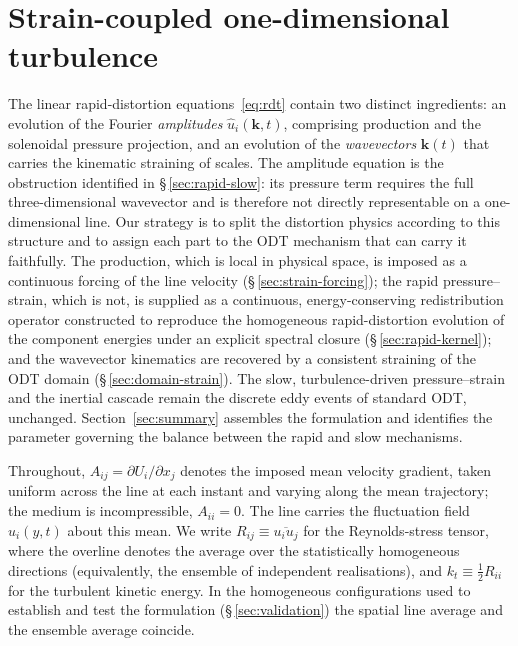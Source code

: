 \documentclass[lineno]{JFM-FLM_Au}
\begin{document}
%

\section{Strain-coupled one-dimensional turbulence}\label{sec:formulation}

The linear rapid-distortion equations~\eqref{eq:rdt} contain two distinct
ingredients: an evolution of the Fourier \emph{amplitudes}
$\hat{u}_i(\boldsymbol{k},t)$, comprising production and the solenoidal
pressure projection, and an evolution of the \emph{wavevectors}
$\boldsymbol{k}(t)$ that carries the kinematic straining of scales. The
amplitude equation is the obstruction identified in
\S\,\ref{sec:rapid-slow}: its pressure term requires the full
three-dimensional wavevector and is therefore not directly representable on
a one-dimensional line. Our strategy is to split the distortion physics
according to this structure and to assign each part to the ODT mechanism
that can carry it faithfully. The production, which is local in physical
space, is imposed as a continuous forcing of the line velocity
(\S\,\ref{sec:strain-forcing}); the rapid pressure--strain, which is not,
is supplied as a continuous, energy-conserving redistribution operator
constructed to reproduce the homogeneous rapid-distortion evolution of the
component energies under an explicit spectral closure
(\S\,\ref{sec:rapid-kernel}); and the wavevector kinematics are recovered by
a consistent straining of the ODT domain
(\S\,\ref{sec:domain-strain}). The slow, turbulence-driven
pressure--strain and the inertial cascade remain the discrete eddy events
of standard ODT, unchanged. Section~\ref{sec:summary} assembles the
formulation and identifies the parameter governing the balance between the
rapid and slow mechanisms.

Throughout, $A_{ij}=\partial U_i/\partial x_j$ denotes the imposed mean
velocity gradient, taken uniform across the line at each instant and
varying along the mean trajectory; the medium is incompressible,
$A_{ii}=0$. The line carries the fluctuation field $u_i(y,t)$ about this
mean. We write $R_{ij}\equiv\overline{u_i u_j}$ for the Reynolds-stress
tensor, where the overline denotes the average over the statistically
homogeneous directions (equivalently, the ensemble of independent
realisations), and $k_t\equiv\tfrac12 R_{ii}$ for the turbulent kinetic
energy. In the homogeneous configurations used to establish and test the
formulation (\S\,\ref{sec:validation}) the spatial line average and the
ensemble average coincide.
\end{document}
